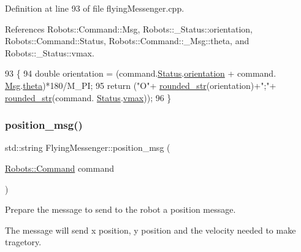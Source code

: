 Definition at line 93 of file flying\+Messenger.\+cpp.



References Robots\+::\+Command\+::\+Msg, Robots\+::\+\_\+\+Status\+::orientation, Robots\+::\+Command\+::\+Status, Robots\+::\+Command\+::\+\_\+\+Msg\+::theta, and Robots\+::\+\_\+\+Status\+::vmax.


\begin{DoxyCode}
93                                                                 \{
94     \textcolor{keywordtype}{double} orientation = (command.\hyperlink{struct_robots_1_1_command_afdad6756a7987d5b8c76ea66fd681d10}{Status}.\hyperlink{struct_robots_1_1___status_ae7a5a28b09e25cf94607fc00b57f7c7e}{orientation} + command.
      \hyperlink{struct_robots_1_1_command_a598cda1f7d4b2879d8a1435ceebbc0db}{Msg}.\hyperlink{struct_robots_1_1_command_1_1___msg_a21599dd0707b283bf1ba1f25544bfb1d}{theta})*180/M\_PI;
95     \textcolor{keywordflow}{return} (\textcolor{stringliteral}{"O"}+ \hyperlink{class_flying_messenger_a687ff0844f83088397544fb7e9aab7cb}{rounded\_str}(orientation)+\textcolor{stringliteral}{";"}+ \hyperlink{class_flying_messenger_a687ff0844f83088397544fb7e9aab7cb}{rounded\_str}(command.
      \hyperlink{struct_robots_1_1_command_afdad6756a7987d5b8c76ea66fd681d10}{Status}.\hyperlink{struct_robots_1_1___status_a2d97c7aa10c75f32c10d25d0683450a3}{vmax}));
96 \}
\end{DoxyCode}
\mbox{\label{class_flying_messenger_a72e6aebf3bf1dba3b053a1f2a0fb13f6}} 
\subsubsection{\texorpdfstring{position\+\_\+msg()}{position\_msg()}}
{\footnotesize\ttfamily std\+::string Flying\+Messenger\+::position\+\_\+msg (\begin{DoxyParamCaption}\item[{\hyperlink{struct_robots_1_1_command}{Robots\+::\+Command}}]{command }\end{DoxyParamCaption})\hspace{0.3cm}{\ttfamily [private]}}



Prepare the message to send to the robot a position message. 

The message will send x position, y position and the velocity needed to make tragetory.


